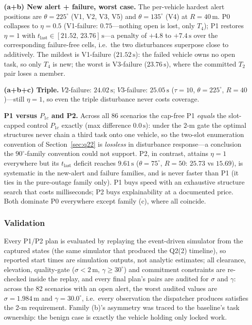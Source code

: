 \textbf{(a+b) New alert + failure, worst case.} The per-vehicle hardest alert positions
are $\theta=225^\circ$ (V1, V2, V3, V5) and $\theta=135^\circ$ (V4) at $R=40\,\mathrm{m}$.
P0 collapses to $\eta=0.5$ (V1-failure: $0.75$---nothing open is lost, only $T_4$);
P1 restores $\eta=1$ with $t_{\mathrm{last}}\in[21.52,\,23.76]\,\mathrm{s}$---a
penalty of $+4.8$ to $+7.4\,\mathrm{s}$ over the corresponding failure-free cells,
i.e.\ the two disturbances superpose close to additively. The mildest is V1-failure
($21.52\,\mathrm{s}$): the failed vehicle owns no open task, so only $T_4$ is new;
the worst is V3-failure ($23.76\,\mathrm{s}$), where the committed $T_2$ pair loses a
member.

\textbf{(a+b+c) Triple.} $V2$-failure: $24.02\,\mathrm{s}$; $V3$-failure:
$25.05\,\mathrm{s}$ ($\tau=10$, $\theta=225^\circ$, $R=40$)---still $\eta=1$, so even
the triple disturbance never costs coverage.

\textbf{P1 versus $P_{1c}$ and P2.} Across all 86 scenarios the cap-free P1
\emph{equals} the slot-capped control $P_{1c}$ exactly (max difference
$0.0\,\mathrm{s}$): under the $2$-m gate the optimal structures never chain a third
task onto one vehicle, so the two-slot enumeration convention of
Section~\ref{sec:q22} is \emph{lossless} in disturbance response---a conclusion the
$90^\circ$-family convention could not support. P2, in contrast, attains $\eta=1$
everywhere but its $t_{\mathrm{last}}$ deficit reaches $9.61\,\mathrm{s}$
($\theta=75^\circ$, $R=50$: $25.73$ vs $15.69$), is systematic in the new-alert and
failure families, and is never faster than P1 (it ties in the pure-outage family
only). P1 buys speed with an exhaustive structure search that costs milliseconds; P2
buys explainability at a documented price. Both dominate P0 everywhere except
family (c), where all coincide.

\subsubsection{Validation}

Every P1/P2 plan is evaluated by replaying the event-driven simulator from the captured
states (the same simulator that produced the Q2(2) timeline), so reported start times
are simulation outputs, not analytic estimates; all clearance, elevation, quality-gate
($\sigma<2\,\mathrm{m}$, $\gamma\ge30^\circ$) and commitment constraints are re-checked
inside the replay, and every final plan's pairs are audited for $\sigma$ and $\gamma$:
across the 82 scenarios with an open alert, the worst audited values are
$\sigma=1.984\,\mathrm{m}$ and $\gamma=30.0^\circ$, i.e.\ every observation the
dispatcher produces satisfies the 2-m requirement. Family (b)'s asymmetry was traced
to the baseline's task ownership: the benign case is exactly the vehicle holding only
locked work.

